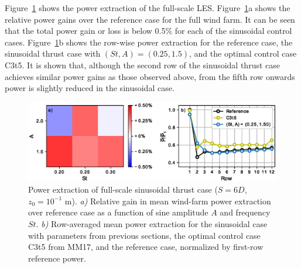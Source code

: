 \documentclass[wes, manuscript]{copernicus}
\newcommand{\revision}[1]{{\color{blue} #1}}
\begin{document}
Figure~\ref{fig:sinus_fullscale} shows the power extraction of the full-scale \revision{LES}. Figure~\ref{fig:sinus_fullscale}a shows the relative power gains over the reference case for the full wind farm. It can be seen that the total power gain or loss is below 0.5\% for each of the sinusoidal control cases. Figure~\ref{fig:sinus_fullscale}b shows the row-wise power extraction for the reference case, the sinusoidal thrust case with $(St, A) = (0.25, 1.5)$, and the optimal control case C3t5. It is shown that, although the second row of the sinusoidal thrust case achieves similar power gains as those observed above, from the fifth row onwards power is slightly reduced in the sinusoidal case.

\begin{figure}
	\centering
	\includegraphics[width=\textwidth]{figure19}
	\caption{Power extraction of full-scale sinusoidal thrust case ($S = 6D$, $z_0 = 10^{-1}$ m). \emph{a) } Relative gain in mean wind-farm power extraction over reference case as a function of sine amplitude $A$ and frequency $St$. \emph{b) } Row-averaged mean power extraction for the sinusoidal case with parameters from previous sections, the optimal control case C3t5 from MM17, and the reference case, normalized by first-row reference power.\label{fig:sinus_fullscale} }
\end{figure}
\end{document}
